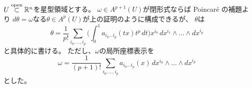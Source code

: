 \documentclass[report]{jlreq}
\begin{document}

\begin{corollary}
    $U \stackrel{\text{open}}{\subset} \mathbb{R}^n$を星型領域とする。
    $\omega \in A^{p + 1}(U)$が閉形式ならば
    Poincar\'{e} の補題より
    $d\theta = \omega$なる$\theta \in A^p(U)$が上の証明のように構成できるが、
    $\theta$は
    \begin{equation}
        \theta =
            \frac{1}{p!} \sum_{i_0, \dots, i_p}
            \biggl(
                \int_0^1 a_{i_0 \dots i_p}(tx)
                t^p \, dt
            \biggr)
            x^{i_0}
            \, dx^{i_1} \wedge \dots \wedge dx^{i_p}
    \end{equation}
    と具体的に書ける。
    ただし、$\omega$の局所座標表示を
    \begin{equation}
        \omega = \frac{1}{(p + 1)!}
            \sum_{i_0, \dots, i_p} a_{i_0 \dots i_p}(x)
            \, dx^{i_0} \wedge \dots \wedge dx^{i_p}
    \end{equation}
    とした。
\end{corollary}
\end{document}

